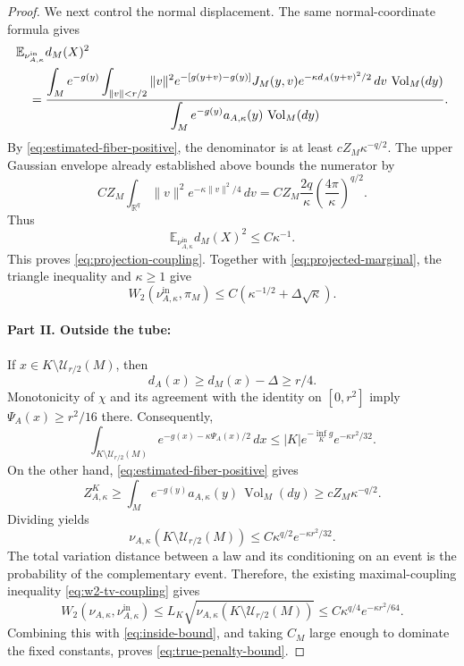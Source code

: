 \documentclass{article}
\newcommand{\E}{\mathbb E}
\newcommand{\Vol}{\operatorname{Vol}}
\newcommand{\cU}{\mathcal U}
\numberwithin{equation}{section}
\begin{document}
\begin{proof}
We next control the normal displacement. The same normal-coordinate
formula gives
\begin{align}
 &\E_{\nu_{A,\kappa}^{\mathrm{in}}}d_M(X)^2\notag\\
 &\quad=
 \frac{\displaystyle
 \int_M e^{-g(y)}
 \int_{\|v\|<r/2}\|v\|^2
 e^{-[g(y+v)-g(y)]}J_M(y,v)
 e^{-\kappa d_A(y+v)^2/2}\,dv\,\Vol_M(dy)}
 {\displaystyle
 \int_M e^{-g(y)}a_{A,\kappa}(y)\,\Vol_M(dy)}.
\label{eq:normal-moment-ratio}
\end{align}
By \eqref{eq:estimated-fiber-positive}, the denominator is at least
$cZ_M\kappa^{-q/2}$.
The upper Gaussian envelope already established above bounds the
numerator by
\[
 CZ_M\int_{\mathbb R^q}\|v\|^2e^{-\kappa\|v\|^2/4}\,dv
 =
 CZ_M\frac{2q}{\kappa}
 \left(\frac{4\pi}{\kappa}\right)^{q/2}.
\]
Thus
\begin{equation}
 \E_{\nu_{A,\kappa}^{\mathrm{in}}}d_M(X)^2
 \le C\kappa^{-1}.
\label{eq:normal-thickness-bound}
\end{equation}
This proves \eqref{eq:projection-coupling}.
Together with \eqref{eq:projected-marginal}, the triangle inequality
and $\kappa\ge1$ give
\begin{equation}
 W_2(\nu_{A,\kappa}^{\mathrm{in}},\pi_M)
 \le C\left(\kappa^{-1/2}+\Delta\sqrt\kappa\right).
\label{eq:inside-bound}
\end{equation}

\paragraph{Part II. Outside the tube:}
If $x\in K\setminus\cU_{r/2}(M)$, then
\[
 d_A(x)\ge d_M(x)-\Delta\ge r/4.
\]
Monotonicity of $\chi$ and its agreement with the identity on
$[0,r^2]$ imply $\Psi_A(x)\ge r^2/16$ there. Consequently,
\[
 \int_{K\setminus\cU_{r/2}(M)}
 e^{-g(x)-\kappa\Psi_A(x)/2}\,dx
 \le |K|e^{-\inf_Kg}e^{-\kappa r^2/32}.
\]
On the other hand, \eqref{eq:estimated-fiber-positive} gives
\begin{equation}
 Z_{A,\kappa}^K
 \ge
 \int_M e^{-g(y)}a_{A,\kappa}(y)\,\Vol_M(dy)
 \ge cZ_M\kappa^{-q/2}.
\label{eq:penalized-normalizer-lower}
\end{equation}
Dividing yields
\begin{equation}
 \nu_{A,\kappa}(K\setminus\cU_{r/2}(M))
 \le C\kappa^{q/2}e^{-\kappa r^2/32}.
\label{eq:outside-mass}
\end{equation}
The total variation distance between a law and its conditioning on
an event is the probability of the complementary event. Therefore,
the existing maximal-coupling inequality \eqref{eq:w2-tv-coupling}
gives
\begin{equation}
 W_2(\nu_{A,\kappa},\nu_{A,\kappa}^{\mathrm{in}})
 \le L_K
 \sqrt{\nu_{A,\kappa}(K\setminus\cU_{r/2}(M))}
 \le C\kappa^{q/4}e^{-\kappa r^2/64}.
\label{eq:outside-w2}
\end{equation}
Combining this with \eqref{eq:inside-bound}, and taking $C_M$ large
enough to dominate the fixed constants, proves
\eqref{eq:true-penalty-bound}.
\end{proof}
\end{document}
